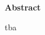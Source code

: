 
\newpage

\vspace*{1cm}

\begin{center}
    \textbf{Abstract}
\end{center}

\vspace*{1cm}

\noindent %

tba   



